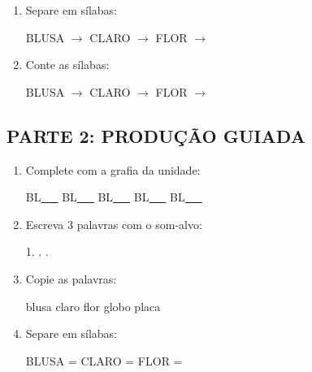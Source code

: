 \begin{exercicio}
\begin{enumerate}
  \item Separe em sílabas:
  \begin{center}
  BLUSA $\rightarrow$ \underline{\hspace{1cm}} \quad CLARO $\rightarrow$ \underline{\hspace{1cm}} \quad FLOR $\rightarrow$ \underline{\hspace{1cm}}
  \end{center}

  \item Conte as sílabas:
  \begin{center}
  BLUSA $\rightarrow$ \underline{\hspace{0.9cm}} \quad CLARO $\rightarrow$ \underline{\hspace{0.9cm}} \quad FLOR $\rightarrow$ \underline{\hspace{0.9cm}}
  \end{center}

\end{enumerate}

\subsection*{PARTE 2: PRODUÇÃO GUIADA}

\begin{enumerate}[resume]

  \item Complete com a grafia da unidade:
  \begin{center}
  BL\underline{~~~} \quad BL\underline{~~~} \quad BL\underline{~~~} \quad BL\underline{~~~} \quad BL\underline{~~~}
  \end{center}

  \item Escreva 3 palavras com o som-alvo:
  \begin{center}
  1. \underline{\hspace{3cm}} . \underline{\hspace{3cm}} . \underline{\hspace{3cm}}
  \end{center}

  \item Copie as palavras:
  \begin{center}
  blusa \quad claro \quad flor \quad globo \quad placa
  \end{center}

  \item Separe em sílabas:
  \begin{center}
  BLUSA = \underline{\hspace{1cm}} \underline{\hspace{1cm}} \quad CLARO = \underline{\hspace{1cm}} \underline{\hspace{1cm}} \quad FLOR = \underline{\hspace{1cm}} \underline{\hspace{1cm}}
  \end{center}


\end{enumerate}
\end{exercicio}

